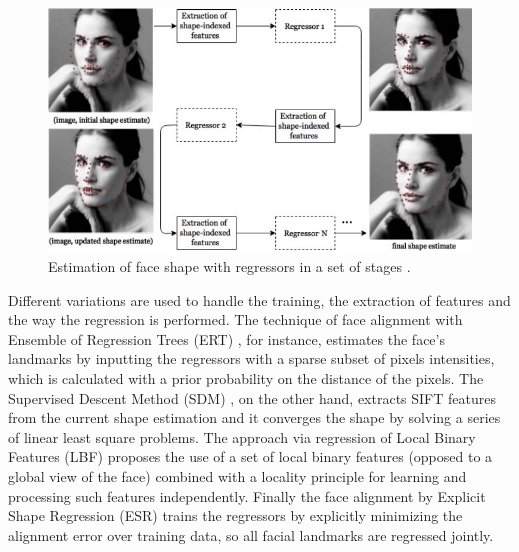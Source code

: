 \begin{figure}[h]
    \centering
    \includegraphics[width=1.0\linewidth]{figures/cascade-explanation.fw.png}
    \caption{Estimation of face shape with regressors in a set of stages \parencite{maris2015}.}
    \label{fig:regressor-steps}
\end{figure}

Different variations are used to handle the training, the extraction of features and the way the regression is performed. The technique of face alignment with Ensemble of Regression Trees (ERT) \parencite{kazemi2014one}, for instance, estimates the face's landmarks by inputting the regressors with a sparse subset of pixels intensities, which is calculated with a prior probability on the distance of the pixels. The Supervised Descent Method (SDM) \parencite{xiong2013supervised}, on the other hand, extracts SIFT features from the current shape estimation and it converges the shape by solving a series of linear least square problems. The approach via regression of Local Binary Features (LBF) \parencite{ren2014face} proposes the use of a set of local binary features (opposed to a global view of the face) combined with a locality principle for learning and processing such features independently. Finally the face alignment by Explicit Shape Regression (ESR) \parencite{cao2014face} trains the regressors by explicitly minimizing the alignment error over training data, so all facial landmarks are regressed jointly.

